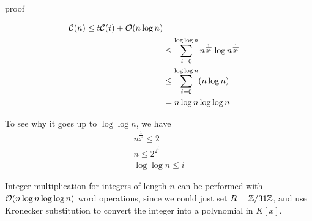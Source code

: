 proof

\begin{align*}
    \mathcal C(n) \le t\mathcal C(t) + \mathcal O(n \log n)\\
    &\le \sum^{\log \log n}_{i=0} n^{\frac{1}{2^i}} \log n^{\frac{1}{2^i}}\\
    &\le \sum^{\log \log n}_{i=0} (n \log n)\\
    &= n \log n \log \log n
\end{align*}

To see why it goes up to $\log \log n$, we have
\begin{align*}
    n^{\frac{1}{2^i}} \le 2\\
    n \le 2^{2^i}\\
    \log \log n \le i
\end{align*}


Integer multiplication for integers of length $n$ can be performed with $\mathcal O(n \log n \log \log n)$ word operations, since we could just set $R = {\mathbb Z} / 31{\mathbb Z}$, and use Kronecker substitution to convert the integer into a polynomial in $K[x]$.
